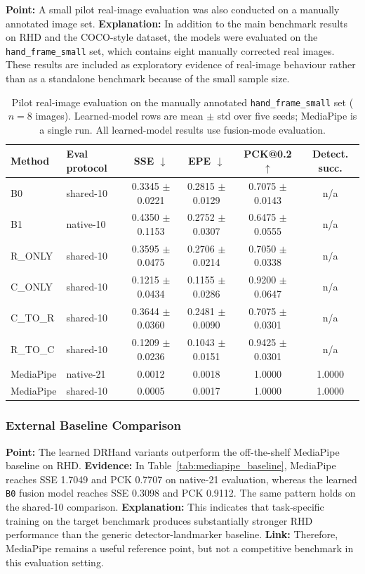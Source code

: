 \documentclass[10pt,letterpaper]{article}
\begin{document}
\medskip
\noindent\textbf{Point:} A small pilot real-image evaluation was also conducted on a manually annotated image set.  
\textbf{Explanation:} In addition to the main benchmark results on RHD and the COCO-style dataset, the models were evaluated on the \texttt{hand\_frame\_small} set, which contains eight manually corrected real images. These results are included as exploratory evidence of real-image behaviour rather than as a standalone benchmark because of the small sample size.

\begin{table}[H]
\centering
\footnotesize
\caption{Pilot real-image evaluation on the manually annotated \texttt{hand\_frame\_small} set ($n=8$ images). Learned-model rows are mean $\pm$ std over five seeds; MediaPipe is a single run. All learned-model results use fusion-mode evaluation.}
\label{tab:hand_frame_small_pilot}
\begin{tabular}{llcccc}
\toprule
Method & Eval protocol & SSE $\downarrow$ & EPE $\downarrow$ & PCK@0.2 $\uparrow$ & Detect. succ. \\
\midrule
B0 & shared-10 & 0.3345 $\pm$ 0.0221 & 0.2815 $\pm$ 0.0129 & 0.7075 $\pm$ 0.0143 & n/a \\
B1 & native-10 & 0.4350 $\pm$ 0.1153 & 0.2752 $\pm$ 0.0307 & 0.6475 $\pm$ 0.0555 & n/a \\
R\_ONLY & shared-10 & 0.3595 $\pm$ 0.0475 & 0.2706 $\pm$ 0.0214 & 0.7050 $\pm$ 0.0338 & n/a \\
C\_ONLY & shared-10 & 0.1215 $\pm$ 0.0434 & 0.1155 $\pm$ 0.0286 & 0.9200 $\pm$ 0.0647 & n/a \\
C\_TO\_R & shared-10 & 0.3644 $\pm$ 0.0360 & 0.2481 $\pm$ 0.0090 & 0.7075 $\pm$ 0.0301 & n/a \\
R\_TO\_C & shared-10 & 0.1209 $\pm$ 0.0236 & 0.1043 $\pm$ 0.0151 & 0.9425 $\pm$ 0.0301 & n/a \\
MediaPipe & native-21 & 0.0012 & 0.0018 & 1.0000 & 1.0000 \\
MediaPipe & shared-10 & 0.0005 & 0.0017 & 1.0000 & 1.0000 \\
\bottomrule
\end{tabular}
\end{table}

\subsubsection{External Baseline Comparison}

\medskip
\noindent\textbf{Point:} The learned DRHand variants outperform the off-the-shelf MediaPipe baseline on RHD.  
\textbf{Evidence:} In Table~\ref{tab:mediapipe_baseline}, MediaPipe reaches SSE 1.7049 and PCK 0.7707 on native-21 evaluation, whereas the learned \texttt{B0} fusion model reaches SSE 0.3098 and PCK 0.9112. The same pattern holds on the shared-10 comparison.  
\textbf{Explanation:} This indicates that task-specific training on the target benchmark produces substantially stronger RHD performance than the generic detector-landmarker baseline.  
\textbf{Link:} Therefore, MediaPipe remains a useful reference point, but not a competitive benchmark in this evaluation setting.
\end{document}
